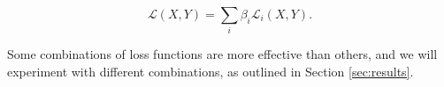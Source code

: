 \begin{equation}
    \mathcal{L}(X, Y) = \sum_{i} \beta_i \mathcal{L}_i(X, Y).
    \label{eq:combined-loss}
\end{equation}

Some combinations of loss functions are more effective than others, and we will experiment with different combinations, as outlined in Section \ref{sec:results}.

% 
% 

